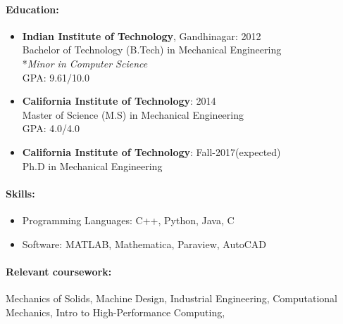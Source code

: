 \documentclass[10pt,fleqn]{article}
\begin{document}
\paragraph*{Education:}
\vspace{-10pt}
\begin{itemize}
\setlength{\itemsep}{5pt}
\setlength{\parskip}{0pt}
\item[] \textbf{Indian Institute of Technology}, Gandhinagar: \hfill 2012\\
		Bachelor of Technology (B.Tech) in Mechanical Engineering\\
		*\textit{Minor in Computer Science}\\
		GPA: 9.61/10.0 
\item[] \textbf{California Institute of Technology}: \hfill 2014\\
		Master of Science (M.S) in Mechanical Engineering\\
		GPA: 4.0/4.0 
\item[] \textbf{California Institute of Technology}: \hfill  Fall-2017(expected)\\
		Ph.D in Mechanical Engineering 
\end{itemize}
\vspace{-10pt}
\paragraph*{Skills:}
\vspace{-10pt}
\begin{itemize}
\setlength{\itemsep}{0pt}
\setlength{\parskip}{0pt}
\item Programming Languages: C++, Python, Java, C
\item Software: MATLAB, Mathematica, Paraview, AutoCAD
\end{itemize}
\vspace{-10pt}
\paragraph*{Relevant coursework:} 
Mechanics of Solids, Machine Design, Industrial Engineering, Computational Mechanics, Intro to High-Performance Computing,  
\end{document}
